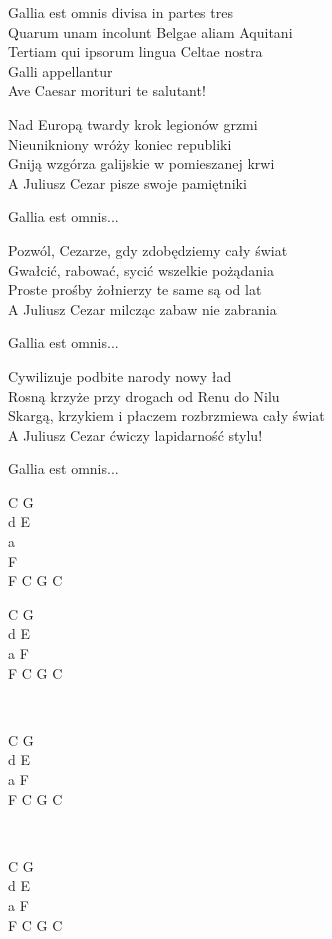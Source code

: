 \begin{text}
    \vin Gallia est omnis divisa in partes tres\\
    \vin Quarum unam incolunt Belgae aliam Aquitani\\
    \vin Tertiam qui ipsorum lingua Celtae nostra\\
    \vin Galli appellantur\\
    \vin Ave Caesar morituri te salutant!

    Nad Europą twardy krok legionów grzmi\\
    Nieunikniony wróży koniec republiki\\
    Gniją wzgórza galijskie w pomieszanej krwi\\
    A Juliusz Cezar pisze swoje pamiętniki

    \vin Gallia est omnis...

    Pozwól, Cezarze, gdy zdobędziemy cały świat\\
    Gwałcić, rabować, sycić wszelkie pożądania\\
    Proste prośby żołnierzy te same są od lat\\
    A Juliusz Cezar milcząc zabaw nie zabrania

    \vin Gallia est omnis...

    Cywilizuje podbite narody nowy ład\\
    Rosną krzyże przy drogach od Renu do Nilu\\
    Skargą, krzykiem i płaczem rozbrzmiewa cały świat\\
    A Juliusz Cezar ćwiczy lapidarność stylu!

    \vin Gallia est omnis...
\end{text}
\begin{chord}
    C G\\
    d E\\
    a\\
    F\\
    F C G C

    C G\\
    d E\\
    a F\\
    F C G C
    
    ~

    C G\\
    d E\\
    a F\\
    F C G C

    ~

    C G\\
    d E\\
    a F\\
    F C G C
\end{chord}
